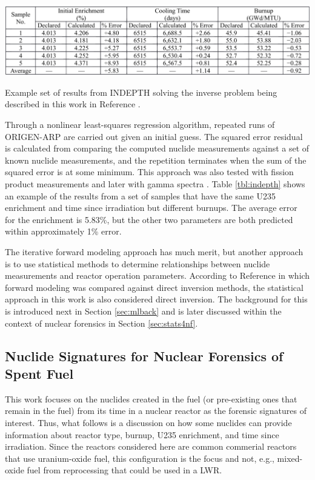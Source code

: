 \begin{table}[!htb]
  \centering
  \includegraphics[width=\linewidth]{./chapters/litrev/indepth.png}
  \caption[Example of results from \acrshort{INDEPTH}]
          {Example set of results from \acrshort{INDEPTH} solving the inverse 
           problem being described in this work in Reference 
           \cite{grogan_indepth_2018}.}
  \label{tbl:indepth}
\end{table}

Through a nonlinear least-squares regression algorithm, repeated runs of
\gls{ORIGEN-ARP} are carried out given an initial guess. The squared error
residual is calculated from comparing the computed nuclide measurements against
a set of known nuclide measurements, and the repetition terminates when the sum
of the squared error is at some minimum.  \cite{weber_2006} This approach was
also tested with fission product measurements \cite{weber_2010} and later with
gamma spectra \cite{weber_2011}. Table \ref{tbl:indepth} shows an example of
the results from a set of samples that have the same \gls{U235} enrichment and
time since irradiation but different burnups.  The average error for the
enrichment is 5.83\%, but the other two parameters are both predicted within
approximately 1\% error. 

The iterative forward modeling approach has much merit, but another approach is
to use statistical methods to determine relationships between nuclide
measurements and reactor operation parameters. According to Reference
\cite{inverse_compare} in which forward modeling was compared against direct
inversion methods, the statistical approach in this work is also considered
direct inversion. The background for this is introduced next in Section
\ref{sec:mlback} and is later discussed within the context of nuclear forensics
in Section \ref{sec:stats4nf}.

\subsection{Nuclide Signatures for Nuclear Forensics of Spent Fuel}
\label{sec:nucs}

This work focuses on the nuclides created in the fuel (or pre-existing ones
that remain in the fuel) from its time in a nuclear reactor as the forensic
signatures of interest. Thus, what follows is a discussion on how some nuclides
can provide information about reactor type, burnup, \gls{U235} enrichment, and
time since irradiation.  Since the reactors considered here are common
commerial reactors that use uranium-oxide fuel, this configuration is the focus
and not, e.g., mixed-oxide fuel from reprocessing that could be used in a
\gls{LWR}.

